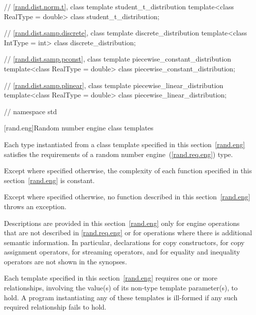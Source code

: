 \begin{codeblock}
{ // \ref{rand.dist.norm.t}, class template student_t_distribution
 template<class RealType = double>
   class student_t_distribution;

 // \ref{rand.dist.samp.discrete}, class template discrete_distribution
 template<class IntType = int>
   class discrete_distribution;

 // \ref{rand.dist.samp.pconst}, class template piecewise_constant_distribution
 template<class RealType = double>
   class piecewise_constant_distribution;

 // \ref{rand.dist.samp.plinear}, class template piecewise_linear_distribution
 template<class RealType = double>
   class piecewise_linear_distribution;

} // namespace std
\end{codeblock}%
%




[rand.eng]{Random number engine class templates}%

\pnum
Each type instantiated
from a class template specified in this section~\ref{rand.eng}
satisfies the requirements
of a random number engine~(\ref{rand.req.eng}) type.

\pnum
Except where specified otherwise,
the complexity of each function
specified in this section~\ref{rand.eng}
is constant.

\pnum
Except
where specified otherwise,
no function described in this section~\ref{rand.eng}
throws an exception.

\pnum
Descriptions are provided in this section~\ref{rand.eng}
only for engine operations
that are not described in  \mbox{\ref{rand.req.eng}}
or for operations where there is additional semantic information.
In particular,
declarations for copy constructors,
for copy assignment operators,
for streaming operators,
and for equality and inequality operators
are not shown in the synopses.

\pnum
Each template specified in this section~\ref{rand.eng}
requires one or more relationships,
involving the value(s) of its non-type template parameter(s), to hold.
A program instantiating any of these templates
is ill-formed
if any such required relationship fails to hold.

